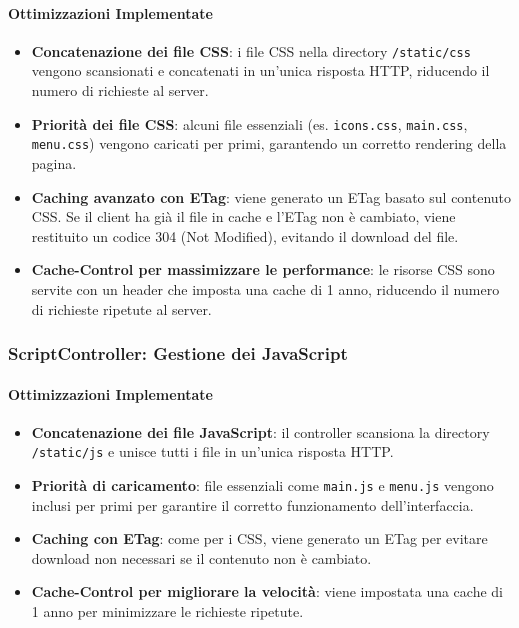 \paragraph{Ottimizzazioni Implementate}
\begin{itemize}
    \item \textbf{Concatenazione dei file CSS}: i file CSS nella directory \texttt{/static/css} vengono scansionati e concatenati in un'unica risposta HTTP, riducendo il numero di richieste al server.
    \item \textbf{Priorit\`a dei file CSS}: alcuni file essenziali (es. \texttt{icons.css}, \texttt{main.css}, \texttt{menu.css}) vengono caricati per primi, garantendo un corretto rendering della pagina.
    \item \textbf{Caching avanzato con ETag}: viene generato un ETag basato sul contenuto CSS. Se il client ha gi\`a il file in cache e l'ETag non \`e cambiato, viene restituito un codice 304 (Not Modified), evitando il download del file.
    \item \textbf{Cache-Control per massimizzare le performance}: le risorse CSS sono servite con un header che imposta una cache di 1 anno, riducendo il numero di richieste ripetute al server.
\end{itemize}

\subsubsection{ScriptController: Gestione dei JavaScript}
\paragraph{Ottimizzazioni Implementate}
\begin{itemize}
    \item \textbf{Concatenazione dei file JavaScript}: il controller scansiona la directory \texttt{/static/js} e unisce tutti i file in un'unica risposta HTTP.
    \item \textbf{Priorit\`a di caricamento}: file essenziali come \texttt{main.js} e \texttt{menu.js} vengono inclusi per primi per garantire il corretto funzionamento dell’interfaccia.
    \item \textbf{Caching con ETag}: come per i CSS, viene generato un ETag per evitare download non necessari se il contenuto non \`e cambiato.
    \item \textbf{Cache-Control per migliorare la velocit\`a}: viene impostata una cache di 1 anno per minimizzare le richieste ripetute.
\end{itemize}


